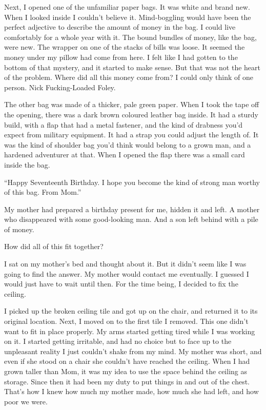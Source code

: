 \documentclass[oneside]{book}
\begin{document}
Next, I opened one of the unfamiliar paper bags. It was white and brand new. When I looked inside I couldn’t believe it. Mind-boggling would have been the perfect adjective to describe the amount of money in the bag. I could live comfortably for a whole year with it. The bound bundles of money, like the bag, were new. The wrapper on one of the stacks of bills was loose. It seemed the money under my pillow had come from here. I felt like I had gotten to the bottom of that mystery, and it started to make sense. But that was not the heart of the problem. Where did all this money come from? I could only think of one person. Nick Fucking-Loaded Foley.

The other bag was made of a thicker, pale green paper. When I took the tape off the opening, there was a dark brown coloured leather bag inside. It had a sturdy build, with a flap that had a metal fastener, and the kind of drabness you’d expect from military equipment. It had a strap you could adjust the length of. It was the kind of shoulder bag you’d think would belong to a grown man, and a hardened adventurer at that. When I opened the flap there was a small card inside the bag.

“Happy Seventeenth Birthday. I hope you become the kind of strong man worthy of this bag. From Mom.”

My mother had prepared a birthday present for me, hidden it and left. A mother who disappeared with some good-looking man. And a son left behind with a pile of money.

How did all of this fit together?

I sat on my mother’s bed and thought about it. But it didn’t seem like I was going to find the answer. My mother would contact me eventually. I guessed I would just have to wait until then. For the time being, I decided to fix the ceiling.

I picked up the broken ceiling tile and got up on the chair, and returned it to its original location. Next, I moved on to the first tile I removed. This one didn’t want to fit in place properly. My arms started getting tired while I was working on it. I started getting irritable, and had no choice but to face up to the unpleasant reality I just couldn’t shake from my mind. My mother was short, and even if she stood on a chair she couldn’t have reached the ceiling. When I had grown taller than Mom, it was my idea to use the space behind the ceiling as storage. Since then it had been my duty to put things in and out of the chest. That’s how I knew how much my mother made, how much she had left, and how poor we were.
\end{document}
